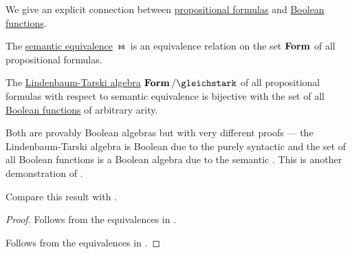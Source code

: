 \begin{theorem}\label{thm:propositional_formula_cosets_are_boolean_functions}
  We give an explicit connection between \hyperref[def:propositional_syntax/formula]{propositional formulas} and \hyperref[def:boolean_function]{Boolean functions}.

  \begin{thmenum}
     The \hyperref[def:propositional_semantics/equivalence]{semantic equivalence} \( \gleichstark \) is an equivalence relation on the set \( \operatorname{\mathbf{Form}} \) of all propositional formulas.

     The \hyperref[def:lindenbaum_tarski_algebra]{Lindenbaum-Tarski algebra}  \( \boldop{Form} / {{}\gleichstark} \) of all propositional formulas with respect to semantic equivalence is bijective with the set of all \hyperref[def:boolean_function]{Boolean functions} of arbitrary arity.

    Both are provably Boolean algebras but with very different proofs --- the Lindenbaum-Tarski algebra is Boolean due to the purely syntactic  and the set of all Boolean functions is a Boolean algebra due to the semantic . This is another demonstration of .

    Compare this result with .
  \end{thmenum}
\end{theorem}
\begin{proof}
   Follows from the equivalences in .

   Follows from the equivalences in .
\end{proof}

